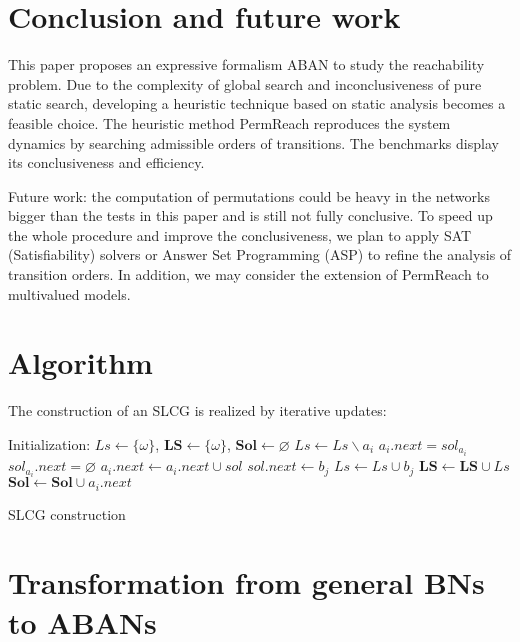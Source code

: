 \documentclass[runningheads]{llncs}
\newcommand{\acm}[3]{\{#1\}\rightarrow#3}
\begin{document}
\section{Conclusion and future work}\label{sect:6}
This paper proposes an expressive formalism ABAN to study the reachability problem. 
Due to the complexity of global search and inconclusiveness of pure static search, developing a heuristic technique based on static analysis becomes a feasible choice.
The heuristic method PermReach reproduces the system dynamics by searching admissible orders of transitions.
The benchmarks display its conclusiveness and efficiency.

Future work: the computation of permutations could be heavy in the networks bigger than the tests in this paper and is still not fully conclusive. 
To speed up the whole procedure and improve the conclusiveness, we plan to apply SAT (Satisfiability) solvers or Answer Set Programming (ASP) to refine the analysis of transition orders. 
In addition, we may consider the extension of PermReach to multivalued models.




\appendix
\section{Algorithm}\label{appendix:B}
The construction of an SLCG is realized by iterative updates:
\begin{algorithm}[ht]
\begin{algorithmic}
\State Initialization: 
$Ls\gets \{\omega\}$, $\mathbf{LS}\gets\{\omega\}$, $\mathbf{Sol}\gets \varnothing$
		\State $Ls\gets Ls\backslash a_i$
			\State $a_i.next=sol_{a_i}$
            \State $sol_{a_i}.next=\varnothing$
    	\Else
    		\For{$sol=\acm{A}{a_{1- i}}{a_i}\in \mathbf{T}$}
    			\State $a_i.next\gets a_i.next\cup sol$
    				\State $sol.next\gets b_j$
    			\EndFor
    			\State $Ls\gets Ls\cup b_j$
                \State $\mathbf{LS}\gets \mathbf{LS}\cup Ls$
    		\EndFor
    		\State$\mathbf{Sol}\gets \mathbf{Sol}\cup a_i.next$           
    	\EndIf
	\EndFor
\EndWhile
\State{}
\end{algorithmic}
\caption{SLCG construction}
\label{algorithm:2}
\end{algorithm}
\section{Transformation from general BNs to ABANs}\label{appendix:C}
\end{document}
